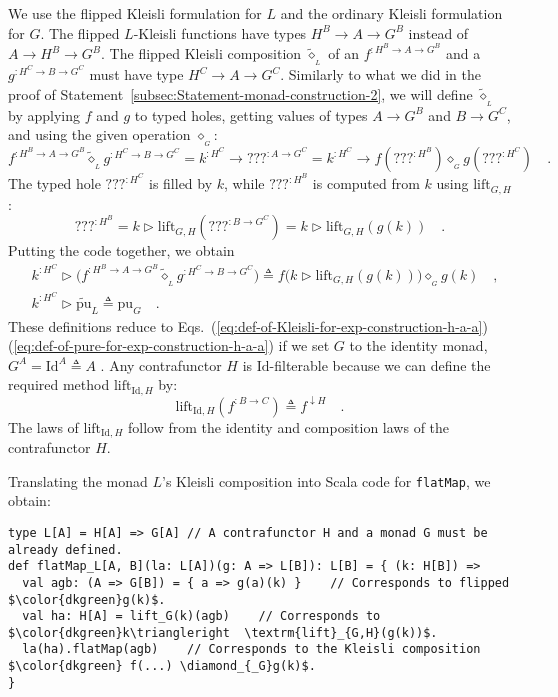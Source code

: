 We use the flipped Kleisli formulation for $L$ and the ordinary Kleisli
formulation for $G$. The flipped $L$-Kleisli functions have types
$H^{B}\rightarrow A\rightarrow G^{B}$ instead of $A\rightarrow H^{B}\rightarrow G^{B}$.
The flipped Kleisli composition $\tilde{\diamond}_{_{L}}$ of an $f^{:H^{B}\rightarrow A\rightarrow G^{B}}$
and a $g^{:H^{C}\rightarrow B\rightarrow G^{C}}$ must have type $H^{C}\rightarrow A\rightarrow G^{C}$.
Similarly to what we did in the proof of Statement~\ref{subsec:Statement-monad-construction-2},
we will define $\tilde{\diamond}_{_{L}}$ by applying $f$ and $g$
to typed holes, getting values of types $A\rightarrow G^{B}$ and
$B\rightarrow G^{C}$, and using the given operation $\diamond_{_{G}}$:
\[
f^{:H^{B}\rightarrow A\rightarrow G^{B}}\tilde{\diamond}_{_{L}}g^{:H^{C}\rightarrow B\rightarrow G^{C}}=k^{:H^{C}}\rightarrow\text{???}^{:A\rightarrow G^{C}}=k^{:H^{C}}\rightarrow f(\text{???}^{:H^{B}})\diamond_{_{G}}g(\text{???}^{:H^{C}})\quad.
\]
The typed hole $\text{???}^{:H^{C}}$ is filled by $k$, while $\text{???}^{:H^{B}}$
is computed from $k$ using $\text{lift}_{G,H}$:
\[
\text{???}^{:H^{B}}=k\triangleright\text{lift}_{G,H}(\text{???}^{:B\rightarrow G^{C}})=k\triangleright\text{lift}_{G,H}(g(k))\quad.
\]
Putting the code together, we obtain
\begin{align*}
 & k^{:H^{C}}\triangleright\big(f^{:H^{B}\rightarrow A\rightarrow G^{B}}\tilde{\diamond}_{_{L}}g^{:H^{C}\rightarrow B\rightarrow G^{C}}\big)\triangleq f\big(k\triangleright\text{lift}_{G,H}(g(k))\big)\diamond_{_{G}}g(k)\quad,\\
 & k^{:H^{C}}\triangleright\tilde{\text{pu}}_{L}\triangleq\text{pu}_{G}\quad.
\end{align*}
These definitions reduce to Eqs.~(\ref{eq:def-of-Kleisli-for-exp-construction-h-a-a})\textendash (\ref{eq:def-of-pure-for-exp-construction-h-a-a})
if we set $G$ to the identity monad, $G^{A}=\text{Id}^{A}\triangleq A$
. Any contrafunctor $H$ is $\text{Id}$-filterable because we can
define the required method $\text{lift}_{\text{Id},H}$ by:
\[
\text{lift}_{\text{Id},H}(f^{:B\rightarrow C})\triangleq f^{\downarrow H}\quad.
\]
The laws of $\text{lift}_{\text{Id},H}$ follow from the identity
and composition laws of the contrafunctor $H$.

Translating the monad $L$\textsf{'}s Kleisli composition into Scala code for
\lstinline!flatMap!, we obtain:
\begin{lstlisting}[mathescape=true]
type L[A] = H[A] => G[A] // A contrafunctor H and a monad G must be already defined.
def flatMap_L[A, B](la: L[A])(g: A => L[B]): L[B] = { (k: H[B]) =>
  val agb: (A => G[B]) = { a => g(a)(k) }    // Corresponds to flipped $\color{dkgreen}g(k)$.
  val ha: H[A] = lift_G(k)(agb)    // Corresponds to $\color{dkgreen}k\triangleright  \textrm{lift}_{G,H}(g(k))$.
  la(ha).flatMap(agb)    // Corresponds to the Kleisli composition $\color{dkgreen} f(...) \diamond_{_G}g(k)$.
}
\end{lstlisting}

